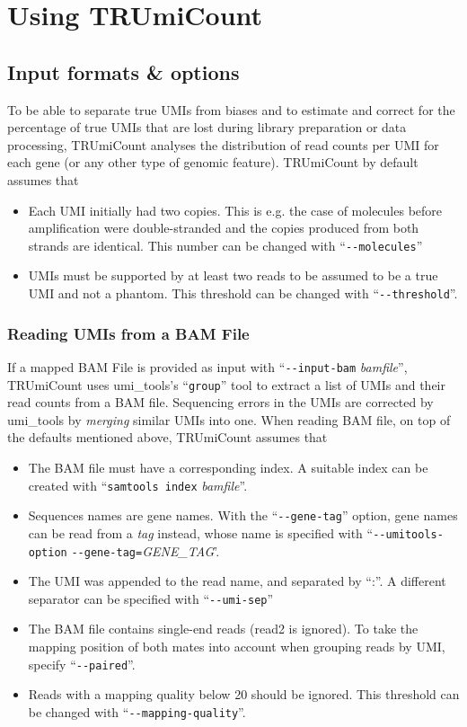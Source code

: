 \documentclass[10pt]{article}
\newcommand{\ddarg}[1]{\texttt{-{}-#1}}
\begin{document}
\pagebreak
\section{Using TRUmiCount}\label{using-trumicount}

\subsection{Input formats \& options}\label{input-options}

To be able to separate true UMIs from biases and to estimate and correct for the percentage of true UMIs that are lost during library preparation or data processing, TRUmiCount analyses the distribution of read counts per UMI for each gene (or any other type of genomic feature). TRUmiCount by default assumes that

\begin{itemize}
  \item Each UMI initially had two copies. This is e.g. the case of molecules before amplification were double-stranded and the copies produced from both strands are identical. This number can be changed with ``\ddarg{molecules}''
  \item UMIs must be supported by at least two reads to be assumed to be a true UMI and not a phantom. This threshold can be changed with ``\ddarg{threshold}''.
\end{itemize}

\subsubsection*{Reading UMIs from a BAM File}

If a mapped BAM File is provided as input with ``\ddarg{input-bam} \textit{bamfile}'', TRUmiCount uses umi\_tools's ``\texttt{group}'' tool to extract a list of UMIs and their read counts from a BAM file. Sequencing errors in the UMIs are corrected by umi\_tools by \emph{merging} similar UMIs into one. When reading BAM file, on top of the defaults mentioned above, TRUmiCount assumes that
\begin{itemize}
  \item The BAM file must have a corresponding index. A suitable index can be created with ``\texttt{samtools index} \textit{bamfile}''.
  \item Sequences names are gene names. With the ``\ddarg{gene-tag}'' option, gene names can be read from a \emph{tag} instead, whose name is specified with ``\ddarg{umitools-option} \allowbreak\ddarg{gene-tag=}\allowbreak\textit{GENE\_TAG}'.
  \item The UMI was appended to the read name, and separated by ``:''. A different separator can be specified with ``\ddarg{umi-sep}''
  \item The BAM file contains single-end reads (read2 is ignored). To take the mapping position of both mates into account when grouping reads by UMI, specify ``\ddarg{paired}''.
  \item Reads with a mapping quality below 20 should be ignored. This threshold can be changed with ``\ddarg{mapping-quality}''.
\end{itemize}
\end{document}
